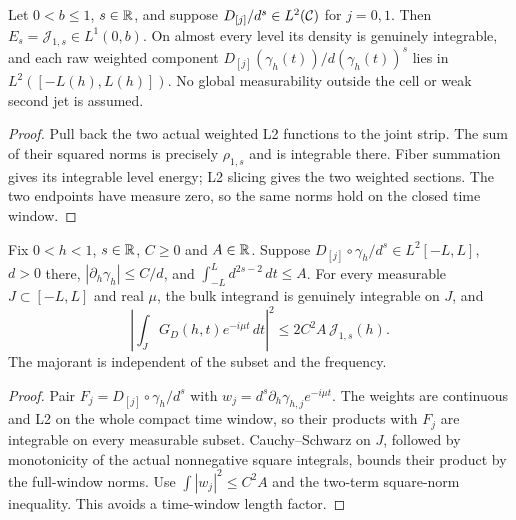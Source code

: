 \begin{lemma}
\label{lem:weighted-quarter-gradient}
\leanok
Let $0<b\le1$, $s\in\mathbb{R}$, and suppose
$D_{[j]}/d^s\in L^2(\mathcal{C})$ for $j=0,1$.
Then $E_s=\mathcal J_{1,s}\in L^1(0,b)$.
On almost every level its density is genuinely integrable, and each
raw weighted component
$D_{[j]}(\gamma_h(t))/d(\gamma_h(t))^s$ lies in
$L^2([-L(h),L(h)])$.
No global measurability outside the cell or weak second jet is assumed.
\end{lemma}

\begin{proof}
\leanok
Pull back the two actual weighted L2 functions to the joint strip.
The sum of their squared norms is precisely $\rho_{1,s}$ and is
integrable there. Fiber summation gives its integrable level energy;
L2 slicing gives the two weighted sections. The two endpoints have
measure zero, so the same norms hold on the closed time window.
\end{proof}

\begin{lemma}
\label{lem:weighted-numerator-subinterval}
\leanok
Fix $0<h<1$, $s\in\mathbb{R}$, $C\ge0$ and $A\in\mathbb{R}$.
Suppose $D_{[j]}\circ\gamma_h/d^s\in L^2[-L,L]$, $d>0$ there,
$|\partial_h\gamma_h|\le C/d$, and $\int_{-L}^Ld^{2s-2}\,dt\le A$.
For every measurable $J\subset[-L,L]$ and real $\mu$, the bulk integrand
is genuinely integrable on $J$, and
\[
 \left|\int_JG_D(h,t)e^{-i\mu t}\,dt\right|^2
 \le2C^2A\,\mathcal J_{1,s}(h).
\]
The majorant is independent of the subset and the frequency.
\end{lemma}

\begin{proof}
\leanok
Pair $F_j=D_{[j]}\circ\gamma_h/d^s$ with
$w_j=d^s\partial_h\gamma_{h,j}e^{-i\mu t}$.
The weights are continuous and L2 on the whole compact time window,
so their products with $F_j$ are integrable on every measurable subset.
Cauchy--Schwarz on $J$, followed by monotonicity of the actual nonnegative
square integrals, bounds their product by the full-window norms.
Use $\int|w_j|^2\le C^2A$ and the two-term square-norm inequality.
This avoids a time-window length factor.
\end{proof}

